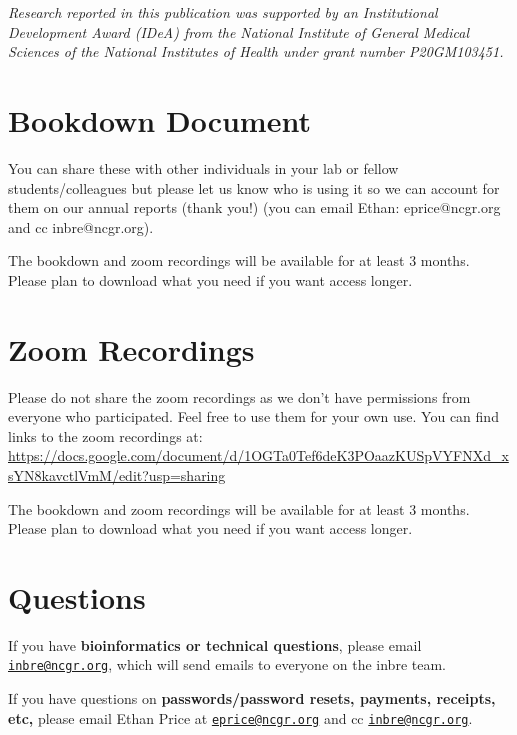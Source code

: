 \documentclass[
]{book}
\begin{document}
{\emph{Research reported in this publication was supported by an Institutional Development Award (IDeA) from the National Institute of General Medical Sciences of the National Institutes of Health under grant number P20GM103451.}}

\hypertarget{bookdown-document}{%
\chapter*{Bookdown Document}\label{bookdown-document}}

You can share these with other individuals in your lab or fellow students/colleagues but please let us know who is using it so we can account for them on our annual reports (thank you!) (you can email Ethan: eprice@ncgr.org and cc inbre@ncgr.org).

The bookdown and zoom recordings will be available for at least 3 months. Please plan to download what you need if you want access longer.

\hypertarget{zoom-recordings}{%
\chapter*{Zoom Recordings}\label{zoom-recordings}}

Please do not share the zoom recordings as we don't have permissions from everyone who participated. Feel free to use them for your own use.
You can find links to the zoom recordings at: \url{https://docs.google.com/document/d/1OGTa0Tef6deK3POaazKUSpVYFNXd_xsYN8kavctlVmM/edit?usp=sharing}

The bookdown and zoom recordings will be available for at least 3 months. Please plan to download what you need if you want access longer.

\hypertarget{questions}{%
\chapter*{Questions}\label{questions}}

If you have \textbf{bioinformatics or technical questions}, please email \href{mailto:inbre@ncgr.org}{\nolinkurl{inbre@ncgr.org}}, which will send emails to everyone on the inbre team.

If you have questions on \textbf{passwords/password resets, payments, receipts, etc,} please email Ethan Price at \href{mailto:eprice@ncgr.org}{\nolinkurl{eprice@ncgr.org}} and cc \href{mailto:inbre@ncgr.org}{\nolinkurl{inbre@ncgr.org}}.
\end{document}
